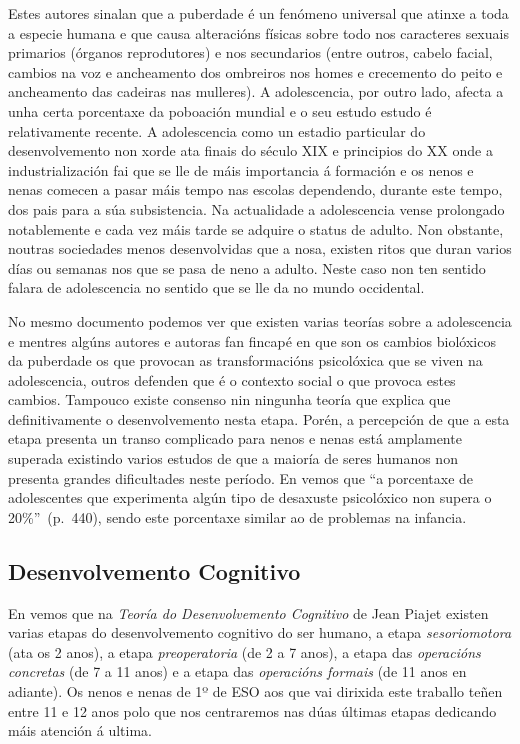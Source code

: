 Estes autores sinalan que a puberdade é un fenómeno universal que atinxe a toda a especie humana e que causa alteracións físicas sobre todo nos caracteres sexuais primarios (órganos reprodutores) e nos secundarios (entre outros, cabelo facial, cambios na voz e ancheamento dos ombreiros nos homes e crecemento do peito e ancheamento das cadeiras nas mulleres). A adolescencia, por outro lado, afecta a unha certa porcentaxe da poboación mundial e o seu estudo estudo é relativamente recente. A adolescencia como un estadio particular do desenvolvemento non xorde ata finais do século XIX e principios do XX onde a industrialización fai que se lle de máis importancia á formación e os nenos e nenas comecen a pasar máis tempo nas escolas dependendo, durante este tempo, dos pais para a súa subsistencia. Na actualidade a adolescencia vense prolongado notablemente e cada vez máis tarde se adquire o status de adulto. Non obstante, noutras sociedades menos desenvolvidas que a nosa, existen ritos que duran varios días ou semanas nos que se pasa de neno a adulto. Neste caso non ten sentido falara de adolescencia no sentido que se lle da no mundo occidental.

No mesmo documento podemos ver que existen varias teorías sobre a adolescencia e mentres algúns autores e autoras fan fincapé en que son os cambios biolóxicos da puberdade os que provocan as transformacións psicolóxica que se viven na adolescencia, outros defenden que é o contexto social o que provoca estes cambios. Tampouco existe consenso nin ningunha teoría que explica que definitivamente o desenvolvemento nesta etapa. Porén, a percepción de que a esta etapa presenta un transo complicado para nenos e nenas está amplamente superada existindo varios estudos de que a maioría de seres humanos non presenta grandes dificultades neste período. En  vemos que ``a porcentaxe de adolescentes que experimenta algún tipo de desaxuste psicolóxico non supera o 20\%''~(p.~440), sendo este porcentaxe similar ao de problemas na infancia.

\subsection{Desenvolvemento Cognitivo}
En  vemos que na \emph{Teoría do Desenvolvemento Cognitivo} de Jean Piajet existen varias etapas do desenvolvemento cognitivo do ser humano, a etapa \emph{sesoriomotora} (ata os 2 anos), a etapa \emph{preoperatoria} (de 2 a 7 anos), a etapa das \emph{operacións concretas} (de 7 a 11 anos) e a etapa das \emph{operacións formais} (de 11 anos en adiante). Os nenos e nenas de 1º de ESO aos que vai dirixida este traballo teñen entre 11 e 12 anos polo que nos centraremos nas dúas últimas etapas dedicando máis atención á ultima.

